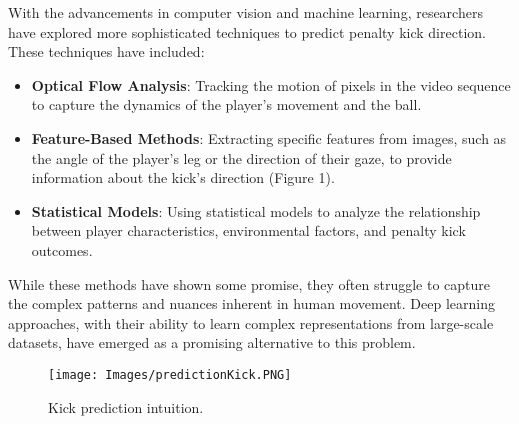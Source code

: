 \documentclass{article}
\begin{document}
With the advancements in computer vision and machine learning, researchers have explored more sophisticated techniques to predict penalty kick direction. These techniques have included:

\begin{itemize}
    \item {\bf Optical Flow Analysis}: Tracking the motion of pixels in the video sequence to capture the dynamics of the player's movement and the ball.
    \item {\bf Feature-Based Methods}: Extracting specific features from images, such as the angle of the player's leg or the direction of their gaze, to provide information about the kick's direction (Figure 1).
    \item {\bf Statistical Models}: Using statistical models to analyze the relationship between player characteristics, environmental factors, and penalty kick outcomes.
\end{itemize}

While these methods have shown some promise, they often struggle to capture the complex patterns and nuances inherent in human movement. Deep learning approaches, with their ability to learn complex representations from large-scale datasets, have emerged as a promising alternative to this problem.

\begin{figure}
    \centering
    \texttt{[image: Images/predictionKick.PNG]}
    \caption{Kick prediction intuition.}
    \label{fig:enter-label}
\end{figure}
\end{document}
